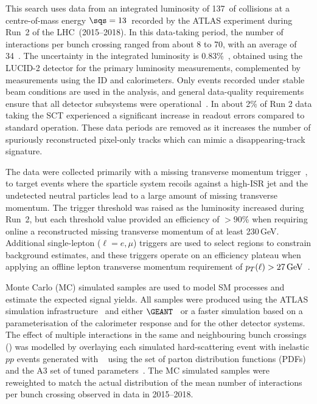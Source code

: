 This search uses data from an integrated luminosity of 137~\ifb of \pp collisions at a centre-of-mass energy $\sqs = 13$~\TeV recorded by the ATLAS experiment during Run~2 of the LHC~(2015--2018). In this data-taking period, the number of interactions per bunch crossing ranged from about 8 to 70, with an average of 34~\cite{DAPR-2018-01}. The uncertainty in the integrated luminosity is 0.83\%~\cite{DAPR-2021-01}, obtained using the LUCID-2 detector for the primary luminosity measurements, complemented by measurements using the ID and calorimeters.
Only events recorded under stable beam conditions are used in the analysis, and general data-quality requirements ensure that all detector subsystems were operational~\cite{DAPR-2018-01}. In about 2\% of Run 2 data taking the SCT experienced a significant increase in readout errors compared to standard operation. These data periods are removed as it increases the number of spuriously reconstructed pixel-only tracks which can mimic a disappearing-track signature.

The data were collected primarily with a missing transverse momentum trigger~\cite{ATL-DAQ-PUB-2016-001,TRIG-2019-01}, to target events where the sparticle system recoils against a high-\pt ISR jet and the undetected neutral particles lead to a large amount of missing transverse momentum. The trigger threshold was raised as the luminosity increased during Run~2, but each threshold value provided an efficiency of ${>}90$\% when requiring online a reconstructed missing transverse momentum of at least 230\,GeV. Additional single-lepton ($\ell = e,\mu$) triggers are used to select regions to constrain background  estimates, and these triggers operate on an efficiency plateau when applying an offline lepton transverse momentum requirement of $p_T(\ell) > 27\,\text{GeV}$~\cite{TRIG-2018-01,TRIG-2018-05}.

Monte Carlo (MC) simulated samples are used to model SM processes and estimate the expected signal yields. 
All samples were produced using the ATLAS simulation infrastructure~\cite{SOFT-2010-01} and either $\GEANT$~\cite{Agostinelli:2002hh} 
or a faster simulation based on a parameterisation of the calorimeter response and \GEANT for the other detector 
systems. The effect of multiple interactions in the same and neighbouring bunch crossings (\pileup) was modelled by overlaying each simulated hard-scattering event with inelastic $pp$ events generated with \PYTHIA[8.186]~\cite{Sjostrand:2007gs} using the \NNPDF[2.3lo] set of parton distribution functions (PDFs)~\cite{Ball:2012cx} and the A3 set of tuned parameters~\cite{ATL-PHYS-PUB-2016-017}. The MC simulated samples were reweighted to match the actual distribution of the mean number of interactions per bunch crossing observed in data in 2015--2018. 

